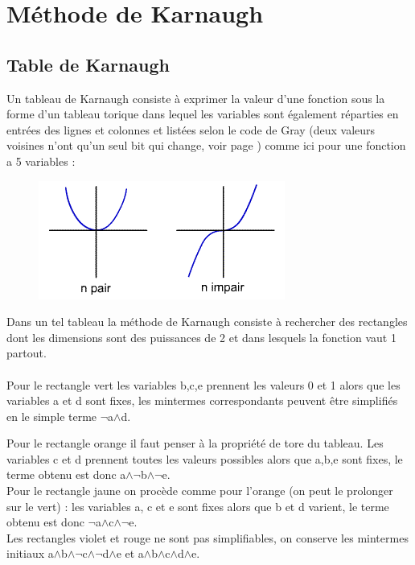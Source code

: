\documentclass[a4paper,10pt]{book}
\begin{document}
\section{Méthode de Karnaugh}
\subsection{Table de Karnaugh}
Un tableau de Karnaugh consiste à exprimer la valeur d'une fonction sous la forme d’un tableau torique dans lequel les variables sont également réparties en entrées des lignes et colonnes et listées selon le code de Gray (deux valeurs voisines n'ont qu'un seul bit qui change, voir page \pageref{gray}) comme ici pour une fonction a 5 variables :\\
\begin{figure} \includegraphics[scale=0.225]{images/008.png} \end{figure}

Dans un tel tableau la méthode de Karnaugh consiste à rechercher des rectangles dont les dimensions sont des puissances de 2 et dans lesquels la fonction vaut 1 partout.\\\\

Pour le rectangle vert les variables b,c,e prennent les valeurs 0 et 1 alors que les variables a et d sont fixes, les mintermes correspondants peuvent être simplifiés en le simple terme $\neg$a$\wedge$d.\bigskip

Pour le rectangle orange il faut penser à la propriété de tore du tableau. Les variables c et d prennent toutes les valeurs possibles alors que a,b,e sont fixes, le terme obtenu est donc a$\wedge\neg$b$\wedge\neg$e.\\

Pour le rectangle jaune on procède comme pour l'orange (on peut le prolonger sur le vert) : les variables a, c et e sont fixes alors que b et d varient, le terme obtenu est donc $\neg$a$\wedge$c$\wedge\neg$e.\\

Les rectangles violet et rouge ne sont pas simplifiables, on conserve les mintermes initiaux a$\wedge$b$\wedge\neg$c$\wedge\neg$d$\wedge$e et a$\wedge$b$\wedge$c$\wedge$d$\wedge$e.\\
\end{document}
